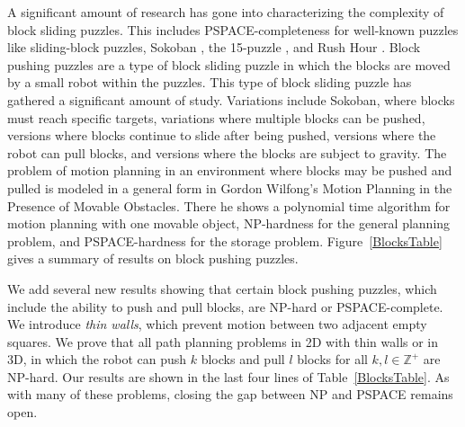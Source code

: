 A significant amount of research has gone into characterizing the complexity of block sliding puzzles. This includes PSPACE-completeness for well-known puzzles like sliding-block puzzles\cite{hearn2005pspace}, Sokoban \cite{Sokoban98, DZ96}, the 15-puzzle \cite{15Puzzle}, and Rush Hour \cite{RushHour02}. Block pushing puzzles are a type of block sliding puzzle in which the blocks are moved by a small robot within the puzzles. This type of block sliding puzzle has gathered a significant amount of study. Variations include Sokoban\cite{Sokoban98, DZ96}, where blocks must reach specific targets, variations where multiple blocks can be pushed\cite{Push100, Push*00, Push2F02}, versions where blocks continue to slide after being pushed\cite{PushPushk04, Push*00}, versions where the robot can pull blocks\cite{Pull10}, and versions where the blocks are subject to gravity\cite{Gravity}. The problem of motion planning in an environment where blocks may be pushed and pulled is modeled in a general form in Gordon Wilfong's Motion Planning in the Presence of Movable Obstacles\cite{PushPull91}. There he shows a polynomial time algorithm for motion planning with one movable object, NP-hardness for the general planning problem, and PSPACE-hardness for the storage problem. Figure~\ref{BlocksTable} gives a summary of results on block pushing puzzles. 



We add several new results showing that certain block pushing puzzles, which include the ability to push and pull blocks, are NP-hard or PSPACE-complete. We introduce \emph{thin walls}, which prevent motion between two adjacent empty squares. We prove that all path planning problems in 2D with thin walls or in 3D, in which the robot can push $k$ blocks and pull $l$ blocks for all $k,l \in \mathbb{Z}^+$ are NP-hard. Our results are shown in the last four lines of Table~\ref{BlocksTable}. As with many of these problems, closing the gap between NP and PSPACE remains open.


